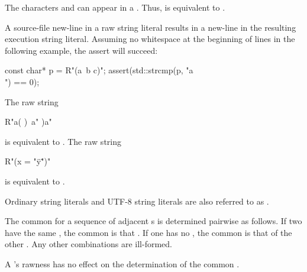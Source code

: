 \pnum
\begin{note}
The characters  and  can appear in a
. Thus,  is equivalent to
.
\end{note}

\pnum
\begin{note}
A source-file new-line in a raw string literal results in a new-line in the
resulting execution string literal. Assuming no
whitespace at the beginning of lines in the following example, the assert will succeed:
\begin{codeblock}
const char* p = R"(a\
b
c)";
assert(std::strcmp(p, "a\\\nb\nc") == 0);
\end{codeblock}
\end{note}

\pnum
\begin{example}
The raw string
\begin{codeblock}
R"a(
)\
a"
)a"
\end{codeblock}
is equivalent to . The raw string
\begin{codeblock}
R"(x = "\"y\"")"
\end{codeblock}
is equivalent to .
\end{example}

\pnum
{}%
Ordinary string literals and UTF-8 string literals are
also referred to as .

\pnum
{}%
The common 
for a sequence of adjacent s
is determined pairwise as follows.
If two {s} have
the same ,
the common  is that .
If one  has no \grammarterm{encoding-prefix},
the common \grammarterm{encoding-prefix} is that
of the other .
Any other combinations are ill-formed.
\begin{note}
A \grammarterm{string-literal}'s rawness has
no effect on the determination of the common .
\end{note}

